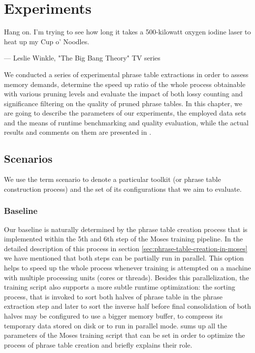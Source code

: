 \chapter{Experiments}
\label{chap:experiments}

\setlength{\epigraphwidth}{1.0\textwidth}
\epigraph{Hang on. I'm trying to see how long it takes a 500-kilowatt oxygen iodine laser to heat up my Cup o' Noodles.}{--- Leslie Winkle, "The Big Bang Theory" TV series}

We conducted a series of experimental phrase table extractions in order to
assess \eppex{} memory demands, determine the speed up ratio of the whole
process obtainable with various pruning levels and evaluate the impact of both
lossy counting and significance filtering on the quality of pruned phrase tables.
In this chapter, we are going to describe the parameters of our experiments,
the employed data sets and the means of runtime benchmarking and quality
evaluation, while the actual results and comments on them are presented in
.

\section{Scenarios}

We use the term scenario to denote a particular toolkit (or phrase table construction process)
and the set of its configurations that we aim to evaluate.

\subsection{Baseline}
\label{sec:baseline-experiments}

Our baseline is naturally determined by the phrase table creation process
that is implemented within the 5th and 6th step of the Moses training pipeline.
In the detailed description of this process in section \ref{sec:phrase-table-creation-in-moses}
we have mentioned that both steps can be partially run in parallel.
This option helps to speed up the whole process whenever training is
attempted on a machine with multiple processing units (cores or threads).
Besides this parallelization, the training script also supports a more subtle
runtime optimization: the sorting process, that is invoked to sort both halves
of phrase table in the phrase extraction step and later to sort the inverse
half before final consolidation of both halves may be configured to use a bigger
memory buffer, to compress its temporary data stored on disk or to run in parallel mode.
 sums up all the parameters of the Moses
training script that can be set in order to optimize the process of phrase
table creation and briefly explains their role.

